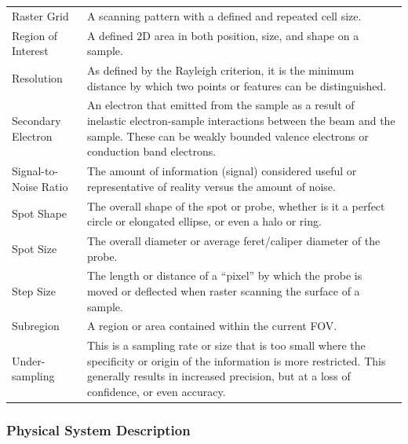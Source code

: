 \documentclass[12pt]{article}
\begin{document}
\begin{center}
\begin{longtable}{p{4.25cm} p{11.25cm}}
        Raster Grid & A scanning pattern with a defined and repeated cell size. \\
        
        Region of Interest & A defined 2D area in both position, size, and shape on a sample. \\
        
        Resolution & As defined by the Rayleigh criterion, it is the minimum distance by which two points or features can be distinguished. \\
        
        Secondary Electron & An electron that emitted from the sample as a result of inelastic electron-sample interactions between the beam and the sample. These can be weakly bounded valence electrons or conduction band electrons. \\
        
        Signal-to-Noise Ratio & The amount of information (signal) considered useful or representative of reality versus the amount of noise. \\
        
        Spot Shape & The overall shape of the spot or probe, whether is it a perfect circle or elongated ellipse, or even a halo or ring. \\
        
        Spot Size & The overall diameter or average feret/caliper diameter of the probe. \\
        
        Step Size & The length or distance of a ``pixel'' by which the probe is moved or deflected when raster scanning the surface of a sample. \\
        
        Subregion & A region or area contained within the current FOV. \\

        Under-sampling & This is a sampling rate or size that is too small where the specificity or origin of the information is more restricted. This generally results in increased precision, but at a loss of confidence, or even accuracy. \\
        \bottomrule
    \end{longtable} 
\end{center}


\subsubsection{Physical System Description} \label{sec_phySystDescrip}
\end{document}
